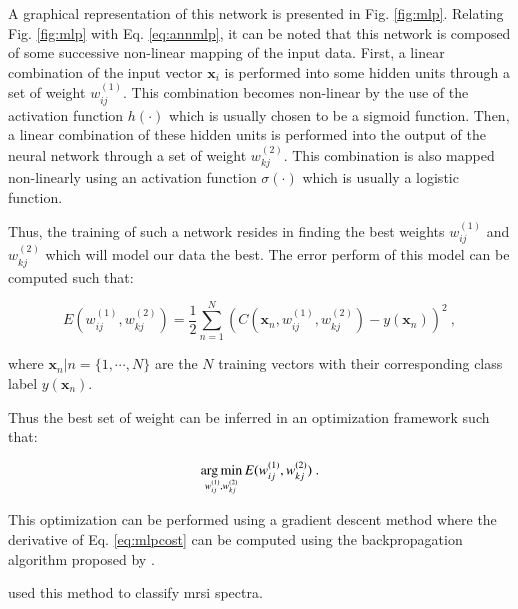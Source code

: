 \begin{enumerate}[leftmargin=*]
A graphical representation of this network is presented in Fig. \ref{fig:mlp}. Relating Fig. \ref{fig:mlp} with Eq. \eqref{eq:annmlp}, it can be noted that this network is composed of some successive non-linear mapping of the input data. First, a linear combination of the input vector $\mathbf{x}_i$ is performed into some hidden units through a set of weight $w_{ij}^{(1)}$. This combination becomes non-linear by the use of the activation function $h(\cdot)$ which is usually chosen to be a sigmoid function. Then, a linear combination of these hidden units is performed into the output of the neural network through a set of weight $w_{kj}^{(2)}$. This combination is also mapped non-linearly using an activation function $\sigma(\cdot)$ which is usually a logistic function.

Thus, the training of such a network resides in finding the best weights $w_{ij}^{(1)}$ and $ w_{kj}^{(2)}$ which will model our data the best. The error perform of this model can be computed such that:

\begin{equation}
	E(w_{ij}^{(1)},w_{kj}^{(2)}) = \frac{1}{2} \sum_{n=1}^{N} \left( C(\mathbf{x}_n,w_{ij}^{(1)},w_{kj}^{(2)}) - y(\mathbf{x}_n) \right) ^{2} \ ,
	\label{eq:mlpcost}
\end{equation}

\noindent where $\mathbf{x}_n|n=\{1,\cdots,N\}$ are the $N$ training vectors with their corresponding class label $y(\mathbf{x}_n)$.

Thus the best set of weight can be inferred in an optimization framework such that:

\begin{equation}
	\operatorname*{arg\,min}_{w_{ij}^{(1)},w_{kj}^{(2)}} E(w_{ij}^{(1)},w_{kj}^{(2)}) \ . 
	\label{eq:mlpopt}
\end{equation}

This optimization can be performed using a gradient descent method where the derivative of Eq. \eqref{eq:mlpcost} can be computed using the backpropagation algorithm proposed by \cite{Rumelhart1988}.

\cite{Matulewicz2013,Parfait2012} used this method to classify \ac{mrsi} spectra.

\begin{figure}
\centering
\def\layersep{3cm}
\def\finallayersep{2.2cm}
\end{figure}
\end{enumerate}
